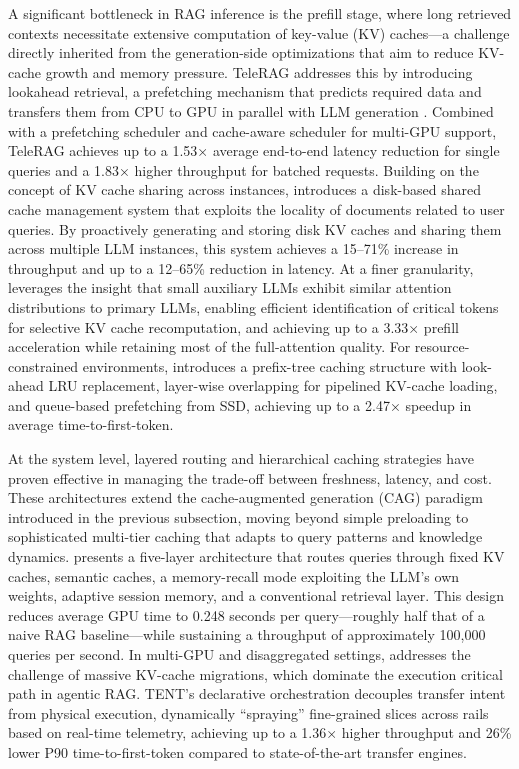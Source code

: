 \documentclass[11pt]{article}
\begin{document}
A significant bottleneck in RAG inference is the prefill stage, where long retrieved contexts necessitate extensive computation of key-value (KV) caches---a challenge directly inherited from the generation-side optimizations that aim to reduce KV-cache growth and memory pressure. TeleRAG addresses this by introducing lookahead retrieval, a prefetching mechanism that predicts required data and transfers them from CPU to GPU in parallel with LLM generation \cite{ref540}. Combined with a prefetching scheduler and cache-aware scheduler for multi-GPU support, TeleRAG achieves up to a 1.53× average end-to-end latency reduction for single queries and a 1.83× higher throughput for batched requests. Building on the concept of KV cache sharing across instances, \cite{ref541} introduces a disk-based shared cache management system that exploits the locality of documents related to user queries. By proactively generating and storing disk KV caches and sharing them across multiple LLM instances, this system achieves a 15--71\% increase in throughput and up to a 12--65\% reduction in latency. At a finer granularity, \cite{ref519} leverages the insight that small auxiliary LLMs exhibit similar attention distributions to primary LLMs, enabling efficient identification of critical tokens for selective KV cache recomputation, and achieving up to a 3.33× prefill acceleration while retaining most of the full-attention quality. For resource-constrained environments, \cite{ref509} introduces a prefix-tree caching structure with look-ahead LRU replacement, layer-wise overlapping for pipelined KV-cache loading, and queue-based prefetching from SSD, achieving up to a 2.47× speedup in average time-to-first-token.

At the system level, layered routing and hierarchical caching strategies have proven effective in managing the trade-off between freshness, latency, and cost. These architectures extend the cache-augmented generation (CAG) paradigm introduced in the previous subsection, moving beyond simple preloading to sophisticated multi-tier caching that adapts to query patterns and knowledge dynamics. \cite{ref542} presents a five-layer architecture that routes queries through fixed KV caches, semantic caches, a memory-recall mode exploiting the LLM's own weights, adaptive session memory, and a conventional retrieval layer. This design reduces average GPU time to 0.248 seconds per query---roughly half that of a naive RAG baseline---while sustaining a throughput of approximately 100,000 queries per second. In multi-GPU and disaggregated settings, \cite{ref543} addresses the challenge of massive KV-cache migrations, which dominate the execution critical path in agentic RAG. TENT's declarative orchestration decouples transfer intent from physical execution, dynamically ``spraying'' fine-grained slices across rails based on real-time telemetry, achieving up to a 1.36× higher throughput and 26\% lower P90 time-to-first-token compared to state-of-the-art transfer engines.
\end{document}

